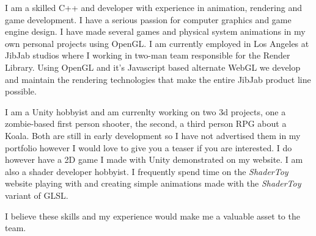 I am a skilled C++ and developer with experience in animation, rendering and game development.
I have a serious passion for computer graphics and game engine design.
I have made several games and physical system animations in my own personal projects using OpenGL.
I am currently employed in Los Angeles at JibJab studios where I working in two-man team responsible for the Render Library.
Using OpenGL and it's Javascript based alternate WebGL we develop and maintain the rendering technologies that make the entire JibJab product line possible. 

I am a Unity hobbyist and am currenlty working on two 3d projects, one a zombie-based first person shooter, the second, a third person RPG about a Koala.
Both are still in early development so I have not advertised them in my portfolio however I would love to give you a teaser if you are interested. 
I do however have a 2D game I made with Unity demonstrated on my website.
I am also a shader developer hobbyist. 
I frequently spend time on the \textit{ShaderToy} website playing with and creating simple animations made with the \textit{ShaderToy} variant of GLSL.

I believe these skills and my experience would make me a valuable asset to the team.



